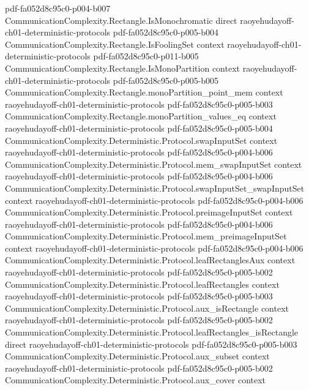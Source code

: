 \begin{theorem}
  {pdf-fa052d8c95c0-p004-b007}
\proofstep
  {CommunicationComplexity.Rectangle.IsMonochromatic}
  {direct}
  {raoyehudayoff-ch01-deterministic-protocols}
  {pdf-fa052d8c95c0-p005-b004}
\proofstep
  {CommunicationComplexity.Rectangle.IsFoolingSet}
  {context}
  {raoyehudayoff-ch01-deterministic-protocols}
  {pdf-fa052d8c95c0-p011-b005}
\proofstep
  {CommunicationComplexity.Rectangle.IsMonoPartition}
  {context}
  {raoyehudayoff-ch01-deterministic-protocols}
  {pdf-fa052d8c95c0-p005-b005}
\proofstep
  {CommunicationComplexity.Rectangle.monoPartition_point_mem}
  {context}
  {raoyehudayoff-ch01-deterministic-protocols}
  {pdf-fa052d8c95c0-p005-b003}
\proofstep
  {CommunicationComplexity.Rectangle.monoPartition_values_eq}
  {context}
  {raoyehudayoff-ch01-deterministic-protocols}
  {pdf-fa052d8c95c0-p005-b004}
\proofstep
  {CommunicationComplexity.Deterministic.Protocol.swapInputSet}
  {context}
  {raoyehudayoff-ch01-deterministic-protocols}
  {pdf-fa052d8c95c0-p004-b006}
\proofstep
  {CommunicationComplexity.Deterministic.Protocol.mem_swapInputSet}
  {context}
  {raoyehudayoff-ch01-deterministic-protocols}
  {pdf-fa052d8c95c0-p004-b006}
\proofstep
  {CommunicationComplexity.Deterministic.Protocol.swapInputSet_swapInputSet}
  {context}
  {raoyehudayoff-ch01-deterministic-protocols}
  {pdf-fa052d8c95c0-p004-b006}
\proofstep
  {CommunicationComplexity.Deterministic.Protocol.preimageInputSet}
  {context}
  {raoyehudayoff-ch01-deterministic-protocols}
  {pdf-fa052d8c95c0-p004-b006}
\proofstep
  {CommunicationComplexity.Deterministic.Protocol.mem_preimageInputSet}
  {context}
  {raoyehudayoff-ch01-deterministic-protocols}
  {pdf-fa052d8c95c0-p004-b006}
\proofstep
  {CommunicationComplexity.Deterministic.Protocol.leafRectanglesAux}
  {context}
  {raoyehudayoff-ch01-deterministic-protocols}
  {pdf-fa052d8c95c0-p005-b002}
\proofstep
  {CommunicationComplexity.Deterministic.Protocol.leafRectangles}
  {context}
  {raoyehudayoff-ch01-deterministic-protocols}
  {pdf-fa052d8c95c0-p005-b003}
\proofstep
  {CommunicationComplexity.Deterministic.Protocol.aux_isRectangle}
  {context}
  {raoyehudayoff-ch01-deterministic-protocols}
  {pdf-fa052d8c95c0-p005-b002}
\proofstep
  {CommunicationComplexity.Deterministic.Protocol.leafRectangles_isRectangle}
  {direct}
  {raoyehudayoff-ch01-deterministic-protocols}
  {pdf-fa052d8c95c0-p005-b003}
\proofstep
  {CommunicationComplexity.Deterministic.Protocol.aux_subset}
  {context}
  {raoyehudayoff-ch01-deterministic-protocols}
  {pdf-fa052d8c95c0-p005-b002}
\proofstep
  {CommunicationComplexity.Deterministic.Protocol.aux_cover}
  {context}

\end{theorem}
